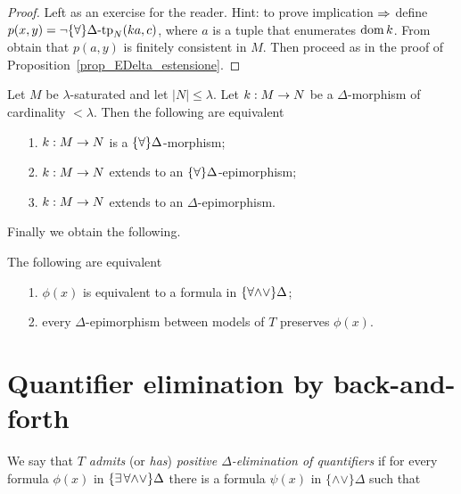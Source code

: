 \begin{proof} Left as an exercise for the reader. Hint: to prove implication $\Rightarrow$ define $p(x,y)=\neg\{\forall\}\Delta\mbox{\rm -tp}_N (ka,c)$, where $a$ is a tuple that enumerates $\mathop{\rm dom} k$. From  obtain that $p(a,y)$ is finitely consistent in $M$. Then proceed as in the proof of Proposition~\ref{prop_EDelta_estensione}.
\end{proof}

\begin{corollary}\label{corol_ADelta_estensione}
Let $M$ be $\lambda$-saturated and let $|N|\le\lambda$. Let $k:M\rightarrow N$ be a $\Delta$-morphism of cardinality $<\lambda$. Then the following are equivalent
\begin{itemize}
\item[1.] $k:M\rightarrow N$ is a $\{\forall\}\Delta$-morphism;
\item[2.] $k:M\rightarrow N$ extends to an $\{\forall\}\Delta$-epimorphism;
\item[3.] $k:M\rightarrow N$ extends to an $\Delta$-epimorphism.\QED
\end{itemize}
\end{corollary}

Finally we obtain the following.

\begin{theorem}
The following are equivalent
\begin{itemize}
\item[1.] $\phi(x)$ is equivalent to a formula in $\{\forall{\wedge}{\vee}\}\Delta$;
\item[2.] every $\Delta$-epimorphism between models of $T$ preserves $\phi(x)$.\QED
\end{itemize}
\end{theorem}


\section{Quantifier elimination by back-and-forth}
\label{eliminazionequantificatoricriterio}

We say that \emph{$T$ admits\/} (or \emph{has\/}) \emph{positive $\Delta$-elimination of quantifiers\/} if for every formula $\phi(x)$ in $\{\exists\,\forall\mathord\wedge\mathord\vee\}\Delta$ there is a formula $\psi(x)$ in $\{\mathord\wedge\mathord\vee\}\Delta$ such that

